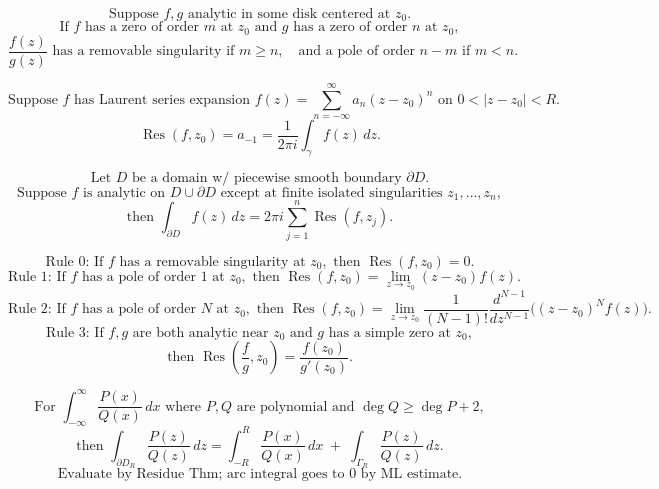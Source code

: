 \documentclass[11pt]{article}
\begin{document}
\[
\text{Suppose }f,g\text{ analytic in some disk centered at }z_0.
\]
\[
\text{If }f\text{ has a zero of order }m\text{ at }z_0
\text{ and }g\text{ has a zero of order }n\text{ at }z_0,
\]
\[
\frac{f(z)}{g(z)}\text{ has a removable singularity if }m\ge n,
\quad
\text{and a pole of order }n-m\text{ if }m<n.
\]

\newpage


\[
\text{Suppose }f\text{ has Laurent series expansion }
f(z)=\sum_{n=-\infty}^{\infty}a_n(z-z_0)^n
\text{ on }0<|z-z_0|<R.
\]
\[
\operatorname{Res}(f,z_0)=a_{-1}
=
\frac{1}{2\pi i}\int_\gamma f(z)\,dz.
\]

\[
\text{Let }D\text{ be a domain w/ piecewise smooth boundary }\partial D.
\]
\[
\text{Suppose }f\text{ is analytic on }D\cup\partial D
\text{ except at finite isolated singularities }z_1,\ldots,z_n,
\]
\[
\text{then }\int_{\partial D}f(z)\,dz
=2\pi i\sum_{j=1}^{n}\operatorname{Res}(f,z_j).
\]

\[
\text{Rule 0: If }f\text{ has a removable singularity at }z_0,\text{ then }\operatorname{Res}(f,z_0)=0.
\]
\[
\text{Rule 1: If }f\text{ has a pole of order }1\text{ at }z_0,\text{ then }
\operatorname{Res}(f,z_0)=\lim_{z\to z_0}(z-z_0)f(z).
\]
\[
\text{Rule 2: If }f\text{ has a pole of order }N\text{ at }z_0,\text{ then }
\operatorname{Res}(f,z_0)=\lim_{z\to z_0}
\frac{1}{(N-1)!}\frac{d^{N-1}}{dz^{N-1}}\bigl((z-z_0)^Nf(z)\bigr).
\]
\[
\text{Rule 3: If }f,g\text{ are both analytic near }z_0
\text{ and }g\text{ has a simple zero at }z_0,
\]
\[
\text{then }\operatorname{Res}\left(\frac{f}{g},z_0\right)=\frac{f(z_0)}{g'(z_0)}.
\]

\[
\text{For }\int_{-\infty}^{\infty}\frac{P(x)}{Q(x)}\,dx
\text{ where }P,Q\text{ are polynomial and }\deg Q\ge \deg P+2,
\]
\[
\text{then }\int_{\partial D_R}\frac{P(z)}{Q(z)}\,dz
=
\int_{-R}^{R}\frac{P(x)}{Q(x)}\,dx
\;+\;\int_{\Gamma_R}\frac{P(z)}{Q(z)}\,dz.
\]
\[
\text{Evaluate by Residue Thm; arc integral goes to }0\text{ by ML estimate.}
\]
\end{document}
